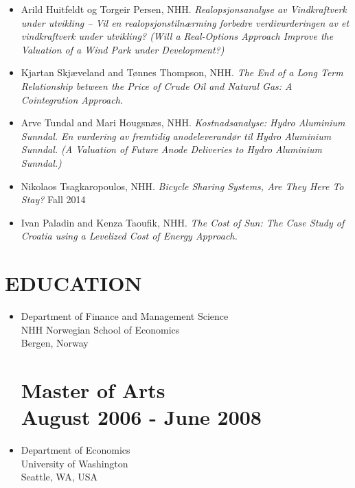 \documentclass[margin]{res}
\begin{document}
\begin{resume}
\begin{itemize}
\begin{itemize}
  \item[] Arild Huitfeldt og Torgeir Persen, NHH.  \emph{Realopsjonsanalyse av Vindkraftverk under utvikling – Vil en realopsjonstiln\ae rming forbedre verdivurderingen av et vindkraftverk under utvikling? (Will a Real-Options Approach Improve the Valuation of a Wind Park under Development?)}
  \item[] Kjartan Skj\ae veland and T\o nnes Thompson, NHH. \emph{The End of a Long Term Relationship between the Price of Crude Oil and Natural Gas: A Cointegration Approach.} 
  \item[] Arve Tundal and Mari Hougsn\ae s, NHH.  \emph{Kostnadsanalyse: Hydro Aluminium Sunndal.  En vurdering av fremtidig anodeleverand\o r til Hydro Aluminium Sunndal. (A Valuation of Future Anode Deliveries to Hydro Aluminium Sunndal.)} 
  \item[] Nikolaos Tsagkaropoulos, NHH. \emph{Bicycle Sharing Systems, Are They Here To Stay?} Fall 2014
  \item[] Ivan Paladin and Kenza Taoufik, NHH. \emph{The Cost of Sun: The Case Study of Croatia using a Levelized Cost of Energy Approach.}
  \end{itemize}
\end{itemize}

\section{EDUCATION}      
 
\begin{itemize}
\normalsize{\section{Ph.D. Business Economics \\ August 2008 - May 2012}} 
\item[] Department of Finance and Management Science\\
NHH Norwegian School of Economics \\
Bergen, Norway \\   

\normalsize{\section{\bf Master of Arts \\ August 2006 - June 2008}}
\item[] Department of Economics \\
University of Washington \\
Seattle, WA, USA \\


\end{itemize}
\end{resume}
\end{document}
